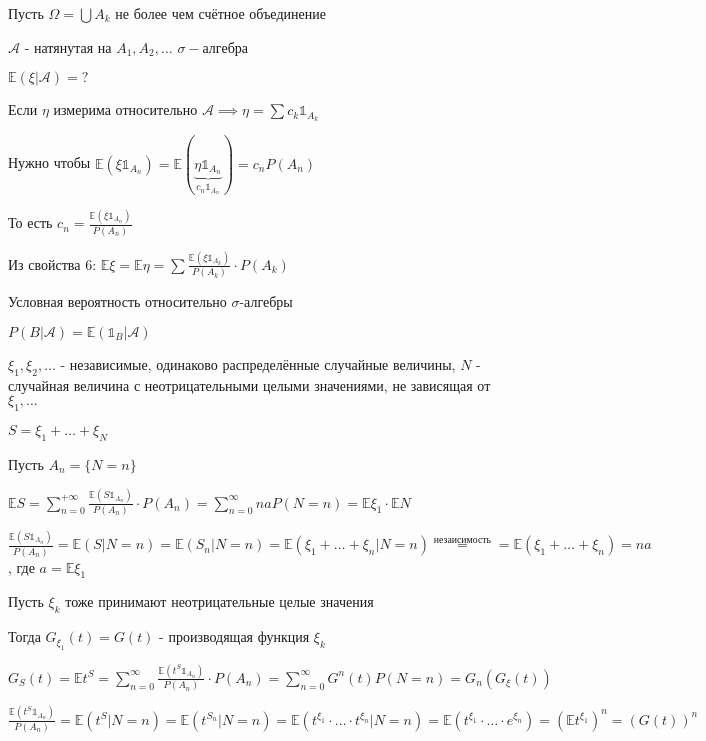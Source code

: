 \begin{example}
    Пусть $\Omega = \bigcup A_k$  не более чем счётное объединение

    $\mathcal{A}$ - натянутая на $A_1, A_2, \ldots$ $\sigma-$алгебра

    $\mathbb{E} (\xi | \mathcal{A}) = ?$

    Если $\eta$ измерима относительно $\mathcal{A} \implies \eta = \sum c_k \mathds{1}_{A_k}$

    Нужно чтобы $\mathbb{E} (\xi \mathds{1}_{A_n}) = \mathbb{E} (\underbrace{\eta \mathds{1}_{A_n}}_{c_n \mathds{1}_{A_n}}) = c_n P(A_n)$

    То есть $c_n = \frac{\mathbb{E} (\xi \mathds{1}_{A_n})}{P(A_n)}$

    \begin{remark}
        Из свойства 6: $\mathbb{E} \xi = \mathbb{E} \eta = \sum \frac{\mathbb{E} (\xi \mathds{1}_{A_k})}{P(A_k)} \cdot P(A_k)$
    \end{remark}
\end{example}

\begin{definition}
    Условная вероятность относительно $\sigma$-алгебры

    $P(B | \mathcal{A}) = \mathbb{E} (\mathds{1}_B | \mathcal{A})$
\end{definition}

\begin{example}
    $\xi_1, \xi_2, \ldots$ - независимые, одинаково распределённые случайные величины, $N$ - случайная величина с неотрицательными целыми значениями, не зависящая от $\xi_1, \ldots$

    $S = \xi_1 + \ldots + \xi_{N}$

    Пусть $A_n = \{ N = n \}$

    $\mathbb{E} S = \sum\limits_{n = 0}^{+\infty} \frac{\mathbb{E} (S \mathds{1}_{A_n})}{P(A_n)} \cdot P(A_n) = \sum\limits_{n = 0}^\infty na P(N = n) = \mathbb{E} \xi_1 \cdot \mathbb{E} N$

    $\frac{\mathbb{E} (S \mathds{1}_{A_n})}{P(A_n)} = \mathbb{E} (S | N = n) = \mathbb{E} (S_n | N = n) = \mathbb{E} (\xi_1 + \ldots + \xi_n | N = n) \overset{\text{незаисимость}}{=} = \mathbb{E} (\xi_1 + \ldots + \xi_n) = na$, где $a = \mathbb{E} \xi_1$
\end{example}

\begin{example}
    Пусть $\xi_k$ тоже принимают неотрицательные целые значения

    Тогда $G_{\xi_1} (t) = G(t)$ - производящая функция $\xi_k$

    $G_S (t) = \mathbb{E} t^S = \sum_{n = 0}^\infty \frac{\mathbb{E} (t^S \mathds{1}_{A_n})}{P(A_n)} \cdot P(A_n) = \sum\limits_{n = 0}^\infty G^n (t) P(N = n) = G_n (G_{\xi} (t))$

    $\frac{\mathbb{E} (t^S \mathds{1}_{A_n})}{P(A_n)} = \mathbb{E} (t^S | N = n) = \mathbb{E} (t^{S_n} | N = n) = \mathbb{E} (t^{\xi_1} \cdot \ldots \cdot t^{\xi_n} | N = n) = \mathbb{E} (t^{\xi_1} \cdot \ldots \cdot e^{\xi_n}) = (\mathbb{E} t^{\xi_1})^n = (G(t))^n$
\end{example}

